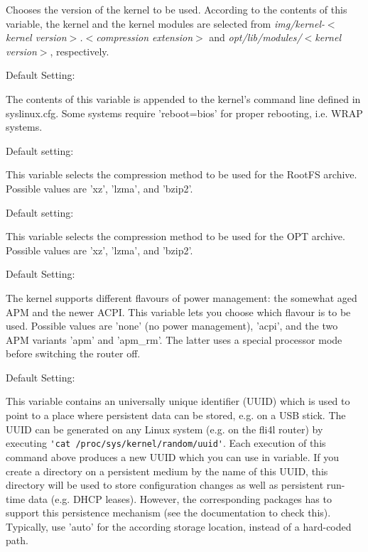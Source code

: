 \begin{description}
  Chooses the version of the kernel to be used. According to the contents of
  this variable, the kernel and the kernel modules are selected from
  \emph{img/kernel-$<$kernel version$>$.$<$compression extension$>$} and
  \emph{opt/lib/modules/$<$kernel version$>$}, respectively.

  
  Default Setting: 

  The contents of this variable is appended to the kernel's command line
  defined in syslinux.cfg. Some systems require 'reboot=bios' for proper 
  rebooting, i.e. WRAP systems.


  Default setting: 

  This variable selects the compression method to be used for the RootFS
  archive. Possible values are 'xz', 'lzma', and 'bzip2'.


  Default setting: 

  This variable selects the compression method to be used for the OPT archive.
  Possible values are 'xz', 'lzma', and 'bzip2'.

  
  Default Setting: 
  
  {
  The kernel supports different flavours of power management: the somewhat aged
  APM and the newer ACPI. This variable lets you choose which flavour is to be
  used. Possible values are 'none' (no power management), 'acpi', and the two
  APM variants 'apm' and 'apm\_rm'. The latter uses a special processor mode
  before switching the router off.}

  
  Default Setting: 

    {This variable contains an universally unique identifier (UUID) which is used
    to point to a place where persistent data can be stored, e.g. on a USB
    stick. The UUID can be generated on any Linux system (e.g. on the fli4l
    router) by executing \verb*?'cat /proc/sys/kernel/random/uuid'?.
    Each execution of this command above produces a new UUID which you can
    use in  variable. If you create a directory on
    a persistent medium by the name of this UUID, this directory will
    be used to store configuration changes as well as persistent run-time data
    (e.g. DHCP leases). However, the corresponding packages has to support
    this persistence mechanism (see the documentation to check this).
    Typically, use 'auto' for the according storage location, instead 
    of a hard-coded path.

}
\end{description}
